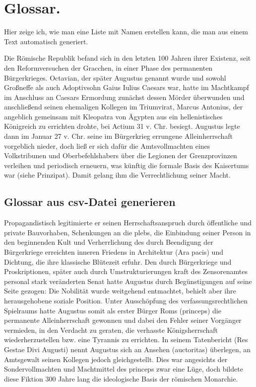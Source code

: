 
\chapter{Glossar.} 
Hier zeige ich, wie man eine Liste mit Namen erstellen kann, die man aus einem Text automatisch generiert.


Die Römische Republik befand sich in den letzten 100 Jahren ihrer Existenz, seit den Reformversuchen der Gracchen, in einer Phase des permanenten Bürgerkrieges. Octavian, der später Augustus genannt wurde und sowohl Großneffe als auch Adoptivsohn Gaius Iulius Caesars war, hatte im Machtkampf im Anschluss an Caesars Ermordung zunächst dessen Mörder überwunden und anschließend seinen ehemaligen Kollegen im Triumvirat, Marcus Antonius, der angeblich gemeinsam mit Kleopatra von Ägypten aus ein hellenistisches Königreich zu errichten drohte, bei Actium 31 v. Chr. besiegt. Augustus legte dann im Januar 27 v. Chr. seine im Bürgerkrieg errungene Alleinherrschaft vorgeblich nieder, doch ließ er sich dafür die Amtsvollmachten eines Volkstribunen und Oberbefehlshabers über die Legionen der Grenzprovinzen verleihen und periodisch erneuern, was künftig die formale Basis des Kaisertums war (siehe Prinzipat). Damit gelang ihm die Verrechtlichung seiner Macht.

\section{Glossar aus csv-Datei generieren}


Propagandistisch legitimierte er seinen Herrschaftsanspruch durch öffentliche und private Bauvorhaben, Schenkungen an die plebs, die Einbindung seiner Person in den beginnenden Kult und Verherrlichung des durch Beendigung der Bürgerkriege erreichten inneren Friedens in Architektur (Ara pacis) und Dichtung, die ihre klassische Blütezeit erfuhr. Den durch Bürgerkriege und Proskriptionen, später auch durch Umstrukturierungen kraft des Zensorenamtes personal stark veränderten Senat hatte Augustus durch Begünstigungen auf seine Seite gezogen: Die Nobilität wurde weitgehend entmachtet, behielt aber ihre herausgehobene soziale Position. Unter Ausschöpfung des verfassungsrechtlichen Spielraums hatte Augustus somit als erster Bürger Roms (princeps) die permanente Alleinherrschaft gewonnen und dabei den Fehler seiner Vorgänger vermieden, in den Verdacht zu geraten, die verhasste Königsherrschaft wiederherzustellen bzw. eine Tyrannis zu errichten. In seinem Tatenbericht (Res Gestae Divi Augusti) nennt Augustus sich an Ansehen (auctoritas) überlegen, an Amtsgewalt seinen Kollegen jedoch gleichgestellt. Dies war angesichts der Sondervollmachten und Machtmittel des princeps zwar eine Lüge, doch bildete diese Fiktion 300 Jahre lang die ideologische Basis der römischen Monarchie.

